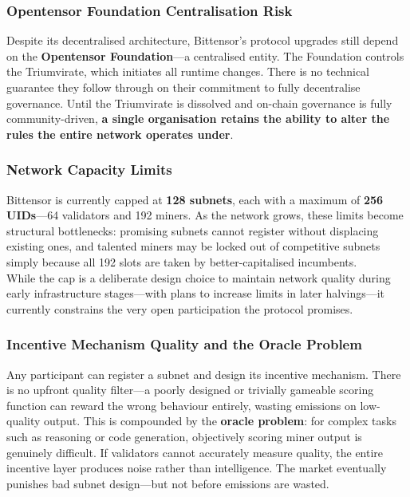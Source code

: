 \documentclass[12pt, a4paper, oneside]{report}
\theoremstyle{definition}
\begin{document}
\subsubsection*{Opentensor Foundation Centralisation Risk}

Despite its decentralised architecture, Bittensor's protocol upgrades still 
depend on the \textbf{Opentensor Foundation}—a centralised entity. The 
Foundation controls the Triumvirate, which initiates all runtime changes. 
There is no technical guarantee they follow through on their commitment to 
fully decentralise governance. Until the Triumvirate is dissolved and 
on-chain governance is fully community-driven, \textbf{a single organisation 
retains the ability to alter the rules the entire network operates under}.



\subsubsection*{Network Capacity Limits}

Bittensor is currently capped at \textbf{128 subnets}, each with a maximum of 
\textbf{256 UIDs}—64 validators and 192 miners. As the network grows, these 
limits become structural bottlenecks: promising subnets cannot register without 
displacing existing ones, and talented miners may be locked out of competitive 
subnets simply because all 192 slots are taken by better-capitalised incumbents.\\[0.2cm]

While the cap is a deliberate design choice to maintain network quality during 
early infrastructure stages—with plans to increase limits in later halvings—it 
currently constrains the very open participation the protocol promises.


\subsubsection*{Incentive Mechanism Quality and the Oracle Problem}

Any participant can register a subnet and design its incentive mechanism. 
There is no upfront quality filter—a poorly designed or trivially gameable 
scoring function can reward the wrong behaviour entirely, wasting emissions 
on low-quality output. This is compounded by the \textbf{oracle problem}: 
for complex tasks such as reasoning or code generation, objectively scoring 
miner output is genuinely difficult. If validators cannot accurately measure 
quality, the entire incentive layer produces noise rather than intelligence. 
The market eventually punishes bad subnet design—but not before emissions 
are wasted.
\end{document}
